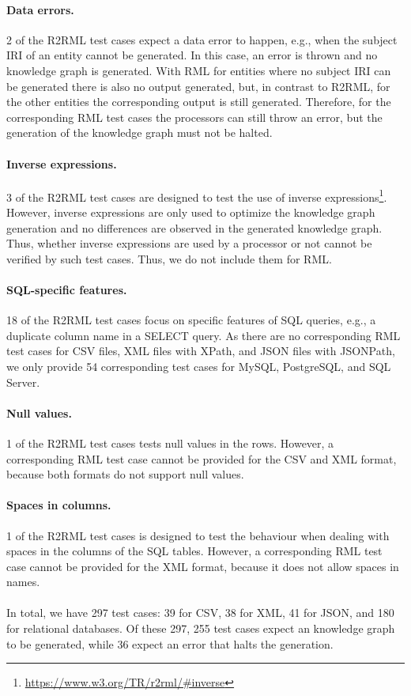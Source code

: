 \paragraph{Data errors.}
2 of the R2RML test cases expect a data error to happen, e.g., when the subject IRI of an entity cannot be generated. In this case, an error is thrown and no knowledge graph is generated. With RML for entities where no subject IRI can be generated there is also no output generated, but, in contrast to R2RML, for the other entities the corresponding output is still generated. Therefore, for the corresponding RML test cases the processors can still throw an error, but the generation of the knowledge graph must not be halted.

\paragraph{Inverse expressions.}
3 of the R2RML test cases are designed to test the use of inverse expressions\footnote{\url{https://www.w3.org/TR/r2rml/\#inverse}}. However, inverse expressions are only used to optimize the knowledge graph generation and no differences are observed in the generated knowledge graph. Thus, whether inverse expressions are used by a processor or not cannot be verified by such test cases. Thus, we do not include them for RML.

\paragraph{SQL-specific features.}
18 of the R2RML test cases focus on specific features of SQL queries, e.g., a duplicate column name in a SELECT query. As there are no corresponding RML test cases for CSV files, XML files with XPath, and JSON files with JSONPath, we only provide 54 corresponding test cases for MySQL, PostgreSQL, and SQL Server.

\paragraph{Null values.}
1 of the R2RML test cases tests null values in the rows. However, a corresponding RML test case cannot be provided for the CSV and XML format, because both formats do not support null values.

\paragraph{Spaces in columns.}
1 of the R2RML test cases is designed to test the behaviour when dealing with spaces in the columns of the SQL tables. However, a corresponding RML test case cannot be provided for the XML format, because it does not allow spaces in names.
\\
\\
In total, we have 297 test cases: 39 for CSV, 38 for XML, 41 for JSON, and 180 for relational databases. Of these 297, 255 test cases expect an knowledge graph to be generated, while 36 expect an error that halts the generation.

